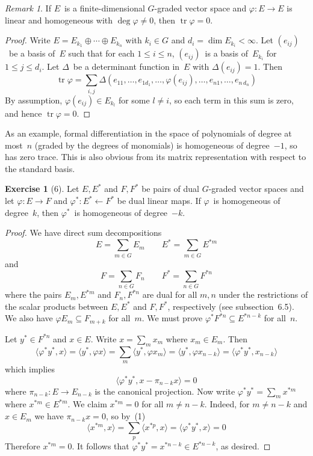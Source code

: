 \documentclass[letterpaper,12pt]{article}
\newcommand{\from}{\leftarrow}
\DeclareMathOperator{\tr}{tr}
\newcommand{\dsum}{\oplus}
\newcommand{\sprod}[2]{\langle#1,#2\rangle}
\theoremstyle{definition}
\newtheorem*{exer}{Exercise}
\theoremstyle{remark}
\newtheorem*{rmk}{Remark}
\begin{document}
\begin{rmk}
If \(E\)~is a finite-dimensional \(G\)-graded vector space and \(\varphi:E\to E\) is linear and homogeneous with \(\deg\varphi\ne 0\), then \(\tr\varphi=0\).
\end{rmk}
\begin{proof}
Write \(E=E_{k_1}\dsum\cdots\dsum E_{k_n}\) with \(k_i\in G\) and \(d_i=\dim E_{k_i}<\infty\). Let \((e_{ij})\)~be a basis of~\(E\) such that for each \(1\le i\le n\), \((e_{ij})\)~is a basis of~\(E_{k_i}\) for \(1\le j\le d_i\). Let \(\Delta\)~be a determinant function in~\(E\) with \(\Delta(e_{ij})=1\). Then
\[\tr\varphi=\sum_{i,j}\Delta(e_{11},\ldots,e_{1d_1},\ldots,\varphi(e_{ij}),\ldots,e_{n1},\ldots,e_{n\,d_n})\]
By assumption, \(\varphi(e_{ij})\in E_{k_l}\) for some \(l\ne i\), so each term in this sum is zero, and hence \(\tr\varphi=0\).
\end{proof}
\noindent As an example, formal differentiation in the space of polynomials of degree at most~\(n\) (graded by the degrees of monomials) is homogeneous of degree~\(-1\), so has zero trace. This is also obvious from its matrix representation with respect to the standard basis.

\begin{exer}[6]
Let \(E,E^*\) and \(F,F^*\) be pairs of dual \(G\)-graded vector spaces and let \(\varphi:E\to F\) and \(\varphi^*:E^*\from F^*\) be dual linear maps. If \(\varphi\)~is homogeneous of degree~\(k\), then \(\varphi^*\)~is homogeneous of degree~\(-k\).
\end{exer}
\begin{proof}
We have direct sum decompositions
\[E=\sum_{m\in G}E_m\qquad E^*=\sum_{m\in G}E^{*m}\]
and
\[F=\sum_{n\in G}F_n\qquad F^*=\sum_{n\in G}F^{*n}\]
where the pairs \(E_m,E^{*m}\) and \(F_n,F^{*n}\) are dual for all \(m,n\) under the restrictions of the scalar products between \(E,E^*\) and \(F,F^*\), respectively (see subsection~6.5). We also have \(\varphi E_m\subseteq F_{m+k}\) for all~\(m\). We must prove \(\varphi^* F^{*n}\subseteq E^{*n-k}\) for all~\(n\).

Let \(y^*\in F^{*n}\) and \(x\in E\). Write \(x=\sum_m x_m\) where \(x_m\in E_m\). Then
\[\sprod{\varphi^* y^*}{x}=\sprod{y^*}{\varphi x}=\sum_m\sprod{y^*}{\varphi x_m}=\sprod{y^*}{\varphi x_{n-k}}=\sprod{\varphi^* y^*}{x_{n-k}}\]
which implies
\[\sprod{\varphi^* y^*}{x-\pi_{n-k}x}=0\tag{1}\]
where \(\pi_{n-k}:E\to E_{n-k}\) is the canonical projection. Now write \(\varphi^* y^*=\sum_m x^{*m}\) where \(x^{*m}\in E^{*m}\). We claim \(x^{*m}=0\) for all \(m\ne n-k\). Indeed, for \(m\ne n-k\) and \(x\in E_m\) we have \(\pi_{n-k}x=0\), so by~(1)
\[\sprod{x^{*m}}{x}=\sum_p\sprod{x^{*p}}{x}=\sprod{\varphi^* y^*}{x}=0\]
Therefore \(x^{*m}=0\). It follows that \(\varphi^* y^*=x^{*n-k}\in E^{*n-k}\), as desired.
\end{proof}
\end{document}
